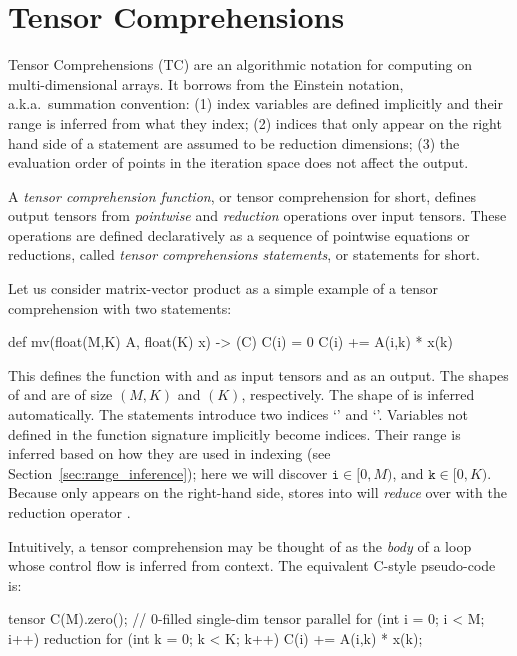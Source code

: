 \section{Tensor Comprehensions}
\label{sec:tc}

Tensor Comprehensions (TC) are an algorithmic notation for computing
on multi-dimensional arrays. It borrows from the Einstein notation,
a.k.a.\ summation convention: (1) index variables are defined
implicitly and their range is inferred
from what they index; (2) indices that only appear on the right hand side of a
statement are assumed to be reduction dimensions;
(3) the evaluation order of points in the iteration space does not
affect the output.

A \emph{tensor comprehension function}, or tensor comprehension for
short, defines output tensors from \emph{pointwise} and
\emph{reduction} operations over input tensors. These operations are
defined declaratively as a sequence of pointwise equations or
reductions, called \emph{tensor comprehensions statements}, or
statements for short.

Let us consider matrix-vector product as a simple example of a tensor
comprehension with two statements:
\begin{tclisting}
def mv(float(M,K) A, float(K) x) -> (C) {
  C(i)  = 0
  C(i) += A(i,k) * x(k)
}
\end{tclisting}
This defines the function  with  and  as input tensors and
 as an output.
The shapes of  and  are of size $(M,K)$ and $(K)$, respectively.
The shape of  is inferred automatically.
The statements introduce two indices `' and
`'. Variables not defined in the function signature implicitly become
indices. Their range is inferred based on how they are used in indexing (see
Section~\ref{sec:range_inference}); here we will discover $\texttt{i} \in
[0,M)$, and $\texttt{k} \in [0,K)$.
Because  only appears on the right-hand side, stores into  will
\emph{reduce} over  with the reduction operator \ic{+}.

Intuitively, a tensor comprehension may be thought of as
the \emph{body} of a loop
whose control flow is inferred from context. The equivalent C-style
pseudo-code is:
\begin{clisting}
tensor C({M}).zero(); // 0-filled single-dim tensor
parallel for (int i = 0; i < M; i++)
  reduction for (int k = 0; k < K; k++)
    C(i) += A(i,k) * x(k);
\end{clisting}

